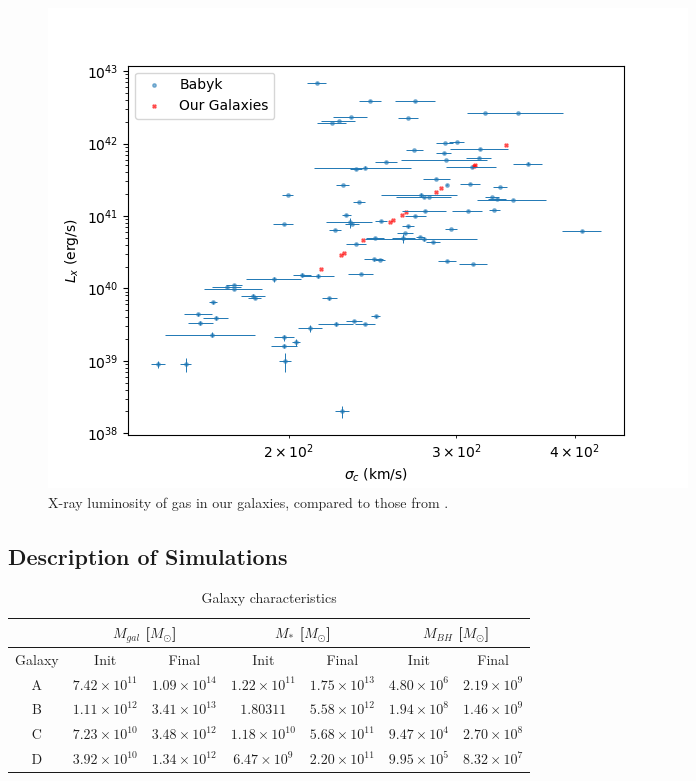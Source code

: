 \documentclass[english, apj]{emulateapj}
\begin{document}
\begin{figure}[htp]
\begin{center}
\includegraphics[width=1.0\columnwidth]{plots/Lx_our_Galaxies_compared_to_Babyk_data.png}
\caption{X-ray luminosity of gas in our galaxies, compared to those from \citet{2018ApJ...857...32B}.}
\label{fig:galgas1}
\end{center}
\end{figure}

\subsection{Description of Simulations}
\begin{table}
\centering
\caption{Galaxy characteristics}
\begin{tabular}{c| c c| c c| c c}
 & \multicolumn{2}{c}{$M_{gal}$ [$M_{\odot}$]} & 
\multicolumn{2}{c}{$M_{*}$ [$M_{\odot}$]} & 
\multicolumn{2}{c}{$M_{BH}$ [$M_{\odot}$]} \\
\hline
Galaxy & Init & Final & Init & Final & Init & Final \\
 \hline
A & $7.42\times10^{11}$ & $1.09\times10^{14}$  & $1.22\times10^{11}$ & $1.75\times10^{13}$ & $4.80\times10^{6}$ & $2.19\times10^{9}$\\
B & $1.11\times10^{12}$ & $3.41\times10^{13}$ & $1.80\mathrm{3}{11}$ & $5.58\times10^{12}$ & $1.94\times10^{8}$ & $1.46\times10^{9}$\\
C & $7.23\times10^{10}$ & $3.48\times10^{12}$ & $1.18\times10^{10}$ & $5.68\times10^{11}$ & $9.47\times10^{4}$ & $2.70\times10^{8}$\\
D & $3.92\times10^{10}$ & $1.34\times10^{12}$ & $6.47\times10^{9}$ & $2.20\times10^{11}$ & $9.95\times10^{5}$ & $8.32\times10^{7}$\\
\end{tabular}
\end{table}
\end{document}
